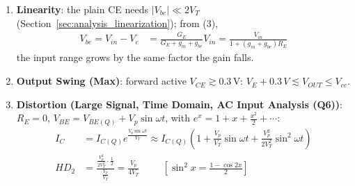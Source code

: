 \begin{enumerate}
    \paragraph{At Output:} \(g_o\) kept, \(V_{in} = 0\) (\(V_{be} = -V_e\)), \(G_C\) removed, \(I_{test}\)
    into the collector. KCL at \(V_e\) and at the collector \(V_c\):
    \begin{align*}
      V_e G_E &= I_{test} + I_b = I_{test} - g_{be} V_e
      \hspace{0.5cm} \Rightarrow \hspace{0.5cm} V_e = \frac{I_{test}}{G_E + g_{be}} = I_{test}(R_E \parallel r_{be}) \\
      I_{test} &= g_m V_{be} + g_o (V_c - V_e) = -(g_m + g_o) V_e + g_o V_c \\
      g_o V_c &= I_{test} + (g_m + g_o) I_{test} (R_E \parallel r_{be}) \\
      Z'_{out} &= \frac{V_c}{I_{test}} = r_o\left(1 + (g_m + g_o)(R_E \parallel r_{be})\right) \approx r_o\left(1 + g_m (R_E \parallel r_{be})\right) \hspace{0.5cm} [g_o \ll g_m] \\
      Z_{out} &= R_C \parallel Z'_{out} \approx R_C
    \end{align*}
  \item \textbf{Linearity}: the plain CE needs \(|V_{be}| \ll 2V_T\)
    (Section~\ref{sec:analysis_linearization}); from (3),
    \begin{align*}
      V_{be} = V_{in} - V_e &= \frac{G_E}{G_E + g_m + g_{be}} V_{in} = \frac{V_{in}}{1 + (g_m + g_{be})R_E}
    \end{align*}
    the input range grows by the same factor the gain falls.
  \item \textbf{Output Swing (Max)}: forward active \(V_{CE} \gtrsim 0.3\,\)V:
    \(V_E + 0.3\,V \lesssim V_{OUT} \leq V_{cc}\).
  \item \textbf{Distortion (Large Signal, Time Domain, AC Input Analysis (Q6))}: \(R_E = 0\),
    \(V_{BE} = V_{BE(Q)} + V_p\sin\omega t\), with \(e^x = 1 + x + \frac{x^2}{2} + \cdots\):
    \begin{align*}
      I_C &= I_{C(Q)}e^{\frac{V_p\sin\omega t}{V_T}} \approx I_{C(Q)}\left(1 + \frac{V_p}{V_T}\sin\omega t + \frac{V_p^2}{2V_T^2}\sin^2\omega t\right) \\
      HD_2 &= \frac{\frac{V_p^2}{2V_T^2}\cdot\frac{1}{2}}{\frac{V_p}{V_T}} = \frac{V_p}{4V_T} \hspace{1cm} [\sin^2 x = \tfrac{1 - \cos 2x}{2}]
    \end{align*}

\end{enumerate}
